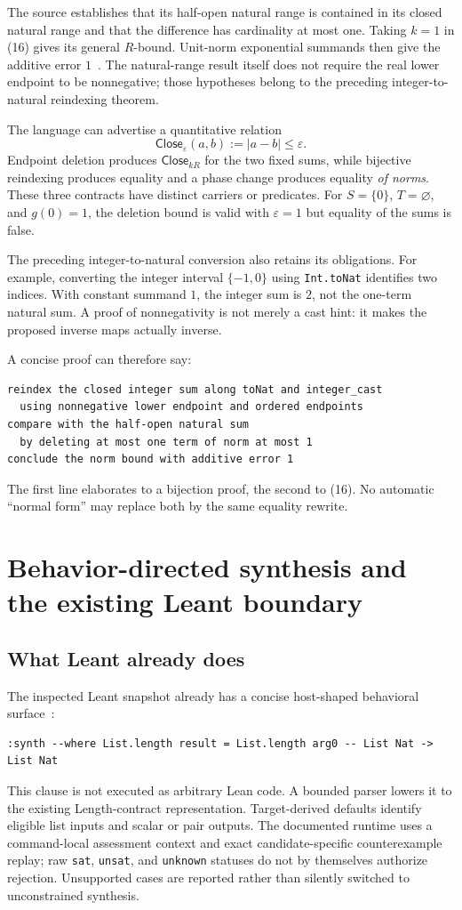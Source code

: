 \documentclass[11pt,letterpaper]{article}
\newcommand{\code}[1]{\nolinkurl{#1}}
\theoremstyle{definition}
\theoremstyle{remark}
\begin{document}
The source establishes that its half-open natural range is contained in its
closed natural range and that the difference has cardinality at most one.
Taking $k=1$ in (16) gives its general $R$-bound. Unit-norm exponential summands
then give the additive error $1$~\cite{PGKB}. The natural-range result itself does
not require the real lower endpoint to be nonnegative; those hypotheses belong
to the preceding integer-to-natural reindexing theorem.

The language can advertise a quantitative relation
\[
\mathsf{Close}_\varepsilon(a,b):=|a-b|\le\varepsilon.
\]
Endpoint deletion produces $\mathsf{Close}_{kR}$ for the two fixed sums, while
bijective reindexing produces equality and a phase change produces equality
\emph{of norms}. These three contracts have distinct carriers or predicates.
For $S=\{0\}$, $T=\varnothing$, and $g(0)=1$, the deletion bound is valid with
$\varepsilon=1$ but equality of the sums is false.

The preceding integer-to-natural conversion also retains its obligations. For
example, converting the integer interval $\{-1,0\}$ using \code{Int.toNat}
identifies two indices. With constant summand $1$, the integer sum is $2$, not
the one-term natural sum. A proof of nonnegativity is not merely a cast hint: it
makes the proposed inverse maps actually inverse.

A concise proof can therefore say:
\begin{lstlisting}
reindex the closed integer sum along toNat and integer_cast
  using nonnegative lower endpoint and ordered endpoints
compare with the half-open natural sum
  by deleting at most one term of norm at most 1
conclude the norm bound with additive error 1
\end{lstlisting}
The first line elaborates to a bijection proof, the second to (16). No automatic
``normal form'' may replace both by the same equality rewrite.

\section{Behavior-directed synthesis and the existing Leant boundary}\label{sec:leant}

\subsection{What Leant already does}
The inspected Leant snapshot already has a concise host-shaped behavioral
surface~\cite{LeantBehavior}:
\begin{lstlisting}
:synth --where List.length result = List.length arg0 -- List Nat -> List Nat
\end{lstlisting}
This clause is not executed as arbitrary Lean code. A bounded parser lowers it
to the existing Length-contract representation. Target-derived defaults identify
eligible list inputs and scalar or pair outputs. The documented runtime uses a
command-local assessment context and exact candidate-specific counterexample
replay; raw \code{sat}, \code{unsat}, and \code{unknown} statuses do not by
themselves authorize rejection. Unsupported cases are reported rather than
silently switched to unconstrained synthesis.
\end{document}
